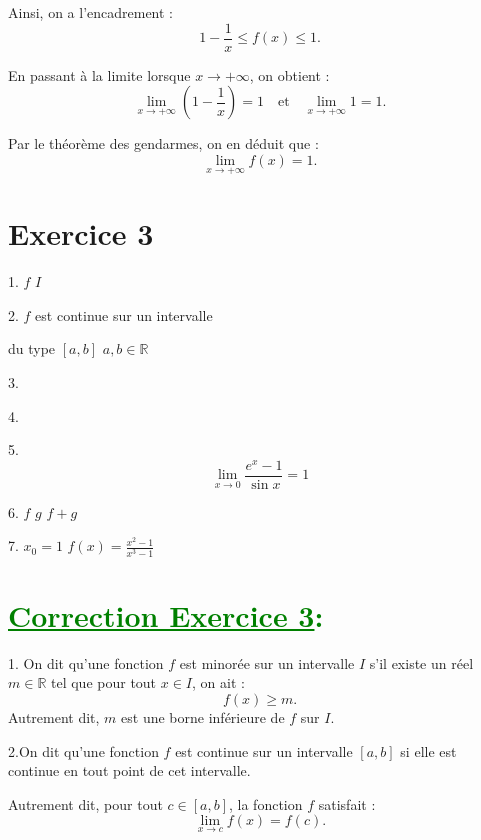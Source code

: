 \documentclass[12pt]{article}
\begin{document}
Ainsi, on a l'encadrement :
\[
1 - \frac{1}{x} \leq f(x) \leq 1.
\]

En passant à la limite lorsque \(x \to +\infty\), on obtient :
\[
\lim_{x \to +\infty} \left( 1 - \frac{1}{x} \right) = 1 \quad \text{et} \quad \lim_{x \to +\infty} 1 = 1.
\]

Par le théorème des gendarmes, on en déduit que :
\[
\lim_{x \to +\infty} f(x) = 1.
\]

\section*{Exercice 3}

1.  \( f \)  \( I \)

2.  \( f \)  est continue sur un intervalle

du type  \([a, b]\)  \(a, b \in \mathbb{R}\) 

3. 

4. 

5.  \[ \lim_{{x \to 0}} \frac{e^{x}-1}{\sin x} = 1 \]

6.  \( f \)  \( g \)  \( f + g \)\\ 

7. \( x_0 = 1\) 
 \(f(x) = \frac{x^2 - 1}{x^3 - 1}\)
 
\section*{\textcolor{green}{\underline{Correction Exercice 3}:}}
1. On dit qu'une fonction \( f \) est minorée sur un intervalle \( I \) s'il existe un réel \( m \in \mathbb{R} \) tel que pour tout \( x \in I \), on ait :
\[
f(x) \geq m.
\]
Autrement dit, \( m \) est une borne inférieure de \( f \) sur \( I \).


2.On dit qu'une fonction \( f \) est continue sur un intervalle \([a, b]\) si elle est continue en tout point de cet intervalle.

Autrement dit, pour tout \( c \in [a, b] \), la fonction \( f \) satisfait :
\[
\lim_{x \to c} f(x) = f(c).
\]
\end{document}
